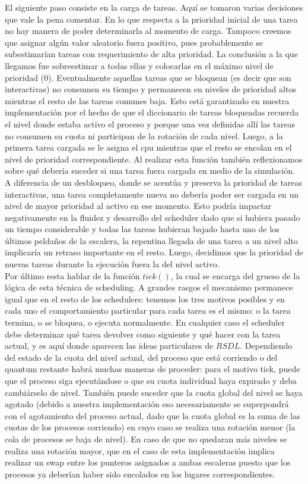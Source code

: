 \indent El siguiente paso consiste en la carga de tareas. Aquí se tomaron varias decisiones que vale la pena comentar. En lo que respecta a la prioridad inicial de una tarea no hay manera de poder determinarla al momento de carga. Tampoco creemos que asignar algún valor aleatorio fuera positivo, pues probablemente se subestimarían tareas con requerimiento de alta prioridad. La conclusión a la que llegamos fue sobreestimar a todas ellas y colocarlas en el máximo nivel de prioridad ($0$). Eventualmente aquellas tareas que se bloquean (es decir que son interactivas) no consumen su tiempo y permanecen en niveles de prioridad altos mientras el resto de las tareas comunes baja. Esto está garantizado en nuestra implementación por el hecho de que el diccionario de tareas bloqueadas recuerda el nivel donde estaba activo el proceso y porque una vez definidas allí las tareas no consumen su cuota ni participan de la rotación de cada nivel. Luego, a la primera tarea cargada se le asigna el cpu mientras que el resto se encolan en el nivel de prioridad correspondiente. Al realizar esta función también reflexionamos sobre qué debería suceder si una tarea fuera cargada en medio de la simulación. A diferencia de un desbloqueo, donde se acentúa y preserva la prioridad de tareas interactivas, una tarea completamente nueva no debería poder ser cargada en un nivel de mayor prioridad al activo en ese momento. Esto podría impactar negativamente en la fluidez y desarrollo del scheduler dado que si hubiera pasado un tiempo considerable y todas las tareas hubieran bajado hasta uno de los últimos peldaños de la escalera, la repentina llegada de una tarea a un nivel alto implicaría un retraso importante en el resto. Luego, decidimos que la prioridad de nuevas tareas durante la ejecución fuera la del nivel activo.\\
\indent Por último resta hablar de la función $tick()$, la cual se encarga del grueso de la lógica de esta técnica de scheduling. A grandes rasgos el mecanismo permanece igual que en el resto de los schedulers: tenemos los tres motivos posibles y en cada uno el comportamiento particular para cada tarea es el mismo: o la tarea termina, o se bloquea, o ejecuta normalmente. En cualquier caso el scheduler debe determinar qué tarea devolver como siguiente y qué hacer con la tarea actual, y es aquí donde aparecen las ideas particulares de $RSDL$. Dependiendo del estado de la cuota del nivel actual, del proceso que está corriendo o del quantum restante habrá muchas maneras de proceder: para el motivo tick, puede que el proceso siga ejecutándose o que su cuota individual haya expirado y deba cambiárselo de nivel. También puede suceder que la cuota global del nivel se haya agotado (debido a nuestra implementación eso necesariamente se superpondrá con el agotamiento del proceso actual, dado que la cuota global es la suma de las cuotas de los procesos corriendo) en cuyo caso se realiza una rotación menor (la cola de procesos se baja de nivel). En caso de que no quedaran más niveles se realiza una rotación mayor, que en el caso de esta implementación implica realizar un swap entre los punteros asignados a ambas escaleras puesto que los procesos ya deberían haber sido encolados en los lugares correspondientes.
